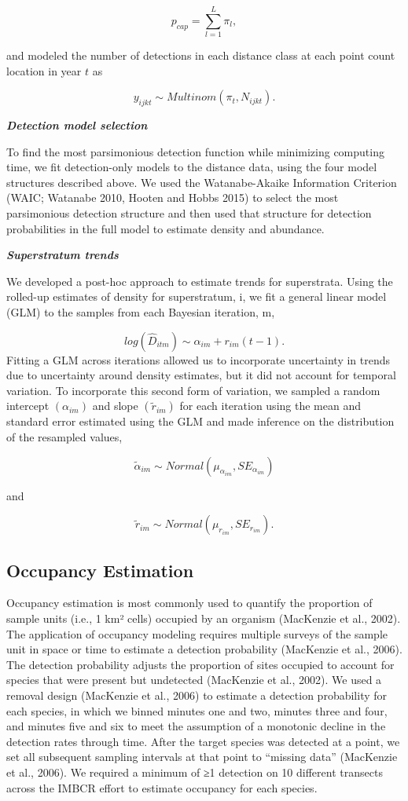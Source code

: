 \documentclass[
  letterpaper,
  DIV=11,
  numbers=noendperiod,
  oneside]{scrreprt}
\begin{document}
\[p_{cap} = ∑_{l=1}^{L}π_{l} ,\]

and modeled the number of detections in each distance class at each
point count location in year \(t\) as

\[y_{ijkt}\sim Multinom(π_{t},N_{ijkt} ).\]

\textbf{\emph{Detection model selection}}

To find the most parsimonious detection function while minimizing
computing time, we fit detection-only models to the distance data, using
the four model structures described above. We used the Watanabe-Akaike
Information Criterion (WAIC; Watanabe 2010, Hooten and Hobbs 2015) to
select the most parsimonious detection structure and then used that
structure for detection probabilities in the full model to estimate
density and abundance.

\textbf{\emph{Superstratum trends}}

We developed a post-hoc approach to estimate trends for superstrata.
Using the rolled-up estimates of density for superstratum, i, we fit a
general linear model (GLM) to the samples from each Bayesian iteration,
m,

\[log⁡(\hat{D}_{itm} )\sim α_{im}+r_{im} (t-1).\] Fitting a GLM across
iterations allowed us to incorporate uncertainty in trends due to
uncertainty around density estimates, but it did not account for
temporal variation. To incorporate this second form of variation, we
sampled a random intercept \((α_{im})\) and slope \((\tilde{r}_{im})\)
for each iteration using the mean and standard error estimated using the
GLM and made inference on the distribution of the resampled values,

\[\tilde{α}_{im} \sim Normal(μ_{α_{im}},SE_{α_{im}})\]

and

\[\tilde{r}_{im}\sim Normal(μ_{r_{im}},SE_{r_{im}}).\]

\hypertarget{occupancy-estimation}{%
\subsection{Occupancy Estimation}\label{occupancy-estimation}}

Occupancy estimation is most commonly used to quantify the proportion of
sample units (i.e., 1 km² cells) occupied by an organism (MacKenzie et
al., 2002). The application of occupancy modeling requires multiple
surveys of the sample unit in space or time to estimate a detection
probability (MacKenzie et al., 2006). The detection probability adjusts
the proportion of sites occupied to account for species that were
present but undetected (MacKenzie et al., 2002). We used a removal
design (MacKenzie et al., 2006) to estimate a detection probability for
each species, in which we binned minutes one and two, minutes three and
four, and minutes five and six to meet the assumption of a monotonic
decline in the detection rates through time. After the target species
was detected at a point, we set all subsequent sampling intervals at
that point to ``missing data'' (MacKenzie et al., 2006). We required a
minimum of ≥1 detection on 10 different transects across the IMBCR
effort to estimate occupancy for each species.
\end{document}
